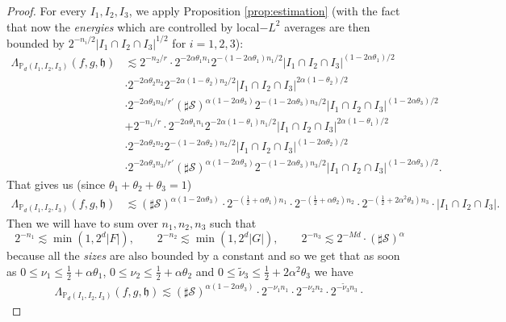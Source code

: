 \documentclass[a4paper,11pt,oneside]{amsart}
\newcommand{\hh}{\mathfrak{h}}
\newcommand{\PP}{\mathbb{P}}
\theoremstyle{plain}
\theoremstyle{definition}
\begin{document}
\begin{proof}
For every $I_1,I_2,I_3$, we apply Proposition \ref{prop:estimation} (with the fact that now the {\it energies} which are controlled by local$-L^2$ averages are then bounded by $2^{-n_i/2}|I_1 \cap I_2 \cap I_3|^{1/2}$ for $i=1,2,3$):
\begin{align*}
 \Lambda_{\PP_d(I_1,I_2,I_3)}(f,g,\hh) & \lesssim 2^{-n_2/r} \cdot 2^{-2\alpha \theta_1 n_1} 2^{-(1-2\alpha \theta_1) n_1/2} |I_1 \cap I_2 \cap I_3|^{(1-2\alpha \theta_1)/2} \\ 
& \cdot 2^{-2\alpha \theta_2 n_2} 2^{-2\alpha(1-\theta_2) n_2/2} |I_1 \cap I_2 \cap I_3|^{2\alpha(1- \theta_2)/2} \\
&  \cdot 2^{-2\alpha \theta_3 n_3/r'} (\sharp {\mathcal S})^{\alpha(1-2\alpha \theta_3)} 2^{-(1-2\alpha \theta_3) n_3/2} |I_1 \cap I_2 \cap I_3|^{(1-2\alpha \theta_3)/2} \\
 & + 2^{-n_1/r} \cdot 2^{-2\alpha \theta_1 n_1} 2^{-2\alpha(1-\theta_1) n_1/2} |I_1 \cap I_2 \cap I_3|^{2\alpha(1-\theta_1)/2} \\ 
& \cdot 2^{-2\alpha \theta_2 n_2} 2^{-(1-2\alpha\theta_2) n_2/2} |I_1 \cap I_2 \cap I_3|^{(1- 2\alpha \theta_2)/2} \\
&  \cdot 2^{-2\alpha \theta_3 n_3/r'} (\sharp {\mathcal S})^{\alpha(1-2\alpha \theta_3)} 2^{-(1-2\alpha \theta_3) n_3/2} |I_1 \cap I_2 \cap I_3|^{(1-2\alpha \theta_3)/2}.
 \end{align*}
That gives us (since $\theta_1+\theta_2+\theta_3=1$)
\begin{align*}
 \Lambda_{\PP_d(I_1,I_2,I_3)}(f,g,\hh) & \lesssim (\sharp {\mathcal S})^{\alpha(1-2\alpha \theta_3)} \cdot 2^{-(\frac{1}{2}+\alpha \theta_1) n_1}  \cdot 2^{-(\frac{1}{2}+\alpha \theta_2) n_2} \cdot 2^{-(\frac{1}{2}+2\alpha^2 \theta_3) n_3} \cdot
 |I_1 \cap I_2 \cap I_3|.
 \end{align*}
Then we will have to sum over $n_1,n_2,n_3$ such that 
\begin{equation} 2^{-n_1} \lesssim \min(1,2^d|F|), \qquad 2^{-n_2}\lesssim \min(1,2^d|G|), \qquad 2^{-n_3}\lesssim 2^{-Md} \cdot (\sharp {\mathcal S})^{\alpha} \label{eq:ni} \end{equation}
because all the {\it sizes} are also bounded by a constant and so we get that as soon as 
$0\leq \nu_1 \leq \frac{1}{2}+\alpha \theta_1$, $0\leq \nu_2 \leq \frac{1}{2}+\alpha \theta_2$ and $0\leq \tilde \nu_3 \leq \frac{1}{2}+2\alpha^2 \theta_3$ we have
\begin{align*}
 \Lambda_{\PP_d(I_1,I_2,I_3)}(f,g,\hh)  \lesssim (\sharp {\mathcal S})^{\alpha(1-2\alpha \theta_3)} \cdot 2^{-\nu_1 n_1}  \cdot 2^{-\nu_2 n_2} \cdot 2^{- \tilde\nu_3 n_3} \cdot

\end{align*}
\end{proof}
\end{document}
